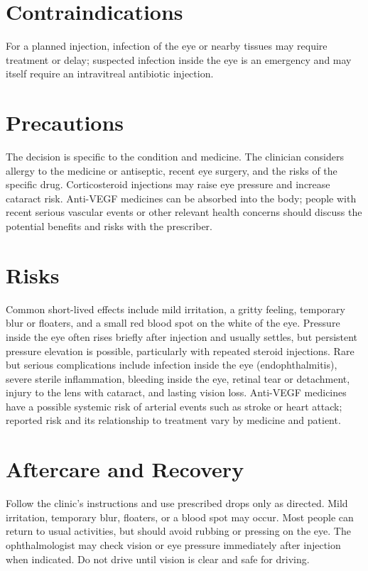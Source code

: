 \section*{Contraindications}
For a planned injection, infection of the eye or nearby tissues may require treatment or delay; suspected infection inside the eye is an emergency and may itself require an intravitreal antibiotic injection.

\section*{Precautions}
The decision is specific to the condition and medicine. The clinician considers allergy to the medicine or antiseptic, recent eye surgery, and the risks of the specific drug. Corticosteroid injections may raise eye pressure and increase cataract risk. Anti-VEGF medicines can be absorbed into the body; people with recent serious vascular events or other relevant health concerns should discuss the potential benefits and risks with the prescriber.

\section*{Risks}
Common short-lived effects include mild irritation, a gritty feeling, temporary blur or floaters, and a small red blood spot on the white of the eye. Pressure inside the eye often rises briefly after injection and usually settles, but persistent pressure elevation is possible, particularly with repeated steroid injections. Rare but serious complications include infection inside the eye (endophthalmitis), severe sterile inflammation, bleeding inside the eye, retinal tear or detachment, injury to the lens with cataract, and lasting vision loss. Anti-VEGF medicines have a possible systemic risk of arterial events such as stroke or heart attack; reported risk and its relationship to treatment vary by medicine and patient.

\section*{Aftercare and Recovery}
Follow the clinic's instructions and use prescribed drops only as directed. Mild irritation, temporary blur, floaters, or a blood spot may occur. Most people can return to usual activities, but should avoid rubbing or pressing on the eye. The ophthalmologist may check vision or eye pressure immediately after injection when indicated. Do not drive until vision is clear and safe for driving.

